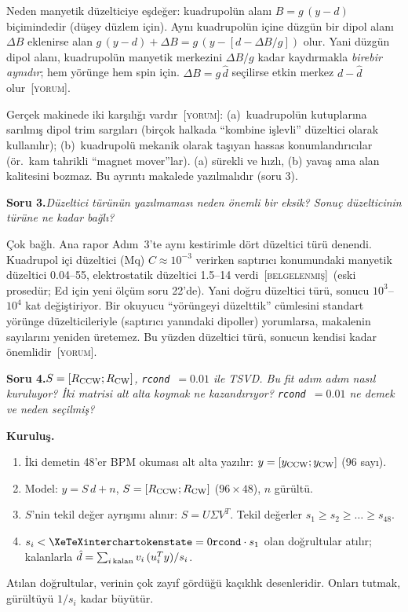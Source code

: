 \documentclass[11pt,a4paper]{article}
\newcommand{\kod}[1]{{\XeTeXinterchartokenstate=0\texttt{#1}}}
\newcommand{\BEL}{\textsc{[belgelenmiş]}}
\newcommand{\YOR}{\textsc{[yorum]}}
\newcounter{soru}
\newcommand{\soru}[2]{%
  \par\medskip\noindent\textbf{Soru #1.}\enspace\textit{#2}\par\nopagebreak\smallskip}
\begin{document}
Neden manyetik düzelticiye eşdeğer: kuadrupolün alanı $B=g\,(y-d)$ biçimindedir (düşey düzlem için). Aynı
kuadrupolün içine düzgün bir dipol alanı $\Delta B$ eklenirse alan $g\,(y-d)+\Delta B=g\,(y-[d-\Delta B/g])$
olur. Yani düzgün dipol alanı, kuadrupolün manyetik merkezini $\Delta B/g$ kadar kaydırmakla
\emph{birebir aynıdır}; hem yörünge hem spin için. $\Delta B=g\,\hat d$ seçilirse etkin merkez $d-\hat d$
olur~\YOR.

Gerçek makinede iki karşılığı vardır~\YOR: (a)~kuadrupolün kutuplarına sarılmış dipol trim sargıları
(birçok halkada ``kombine işlevli'' düzeltici olarak kullanılır); (b)~kuadrupolü mekanik olarak taşıyan
hassas konumlandırıcılar (ör.\ kam tahrikli ``magnet mover''lar). (a) sürekli ve hızlı, (b) yavaş ama
alan kalitesini bozmaz. Bu ayrıntı makalede yazılmalıdır (soru 3).

\soru{3}{Düzeltici türünün yazılmaması neden önemli bir eksik? Sonuç düzelticinin türüne ne kadar bağlı?}

Çok bağlı. Ana rapor Adım~3'te aynı kestirimle dört düzeltici türü denendi. Kuadrupol içi düzeltici (Mq)
$C\approx10^{-3}$ verirken saptırıcı konumundaki manyetik düzeltici 0.04--55, elektrostatik düzeltici
1.5--14 verdi~\BEL\ (eski prosedür; Ed için yeni ölçüm soru 22'de). Yani doğru düzeltici türü, sonucu
$10^3$--$10^4$ kat değiştiriyor. Bir okuyucu ``yörüngeyi düzelttik'' cümlesini standart yörünge
düzelticileriyle (saptırıcı yanındaki dipoller) yorumlarsa, makalenin sayılarını yeniden üretemez. Bu
yüzden düzeltici türü, sonucun kendisi kadar önemlidir~\YOR.

\soru{4}{$S=[R_{\rm CCW};R_{\rm CW}]$, \kod{rcond}~$=0.01$ ile TSVD. Bu fit adım adım nasıl kuruluyor?
İki matrisi alt alta koymak ne kazandırıyor? \kod{rcond}~$=0.01$ ne demek ve neden seçilmiş?}

\textbf{Kuruluş.}
\begin{enumerate}[nosep]
\item İki demetin 48'er BPM okuması alt alta yazılır: $y=[y_{\rm CCW};y_{\rm CW}]$ (96 sayı).
\item Model: $y=S\,d+n$, $S=[R_{\rm CCW};R_{\rm CW}]$ ($96\times48$), $n$ gürültü.
\item $S$'nin tekil değer ayrışımı alınır: $S=U\Sigma V^{T}$. Tekil değerler $s_1\ge s_2\ge\dots\ge s_{48}$.
\item $s_i<\kod{rcond}\cdot s_1$ olan doğrultular atılır; kalanlarla $\hat d=\sum_{i\,\rm kalan} v_i\,(u_i^{T}y)/s_i$.
\end{enumerate}
Atılan doğrultular, verinin çok zayıf gördüğü kaçıklık desenleridir. Onları tutmak, gürültüyü $1/s_i$
kadar büyütür.
\end{document}
